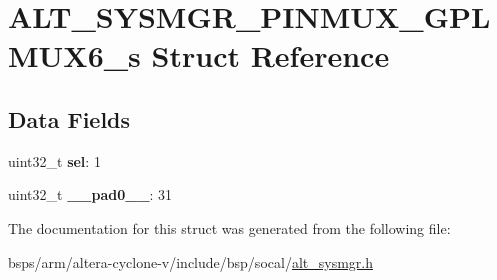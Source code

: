 \hypertarget{structALT__SYSMGR__PINMUX__GPLMUX6__s}{}\section{A\+L\+T\+\_\+\+S\+Y\+S\+M\+G\+R\+\_\+\+P\+I\+N\+M\+U\+X\+\_\+\+G\+P\+L\+M\+U\+X6\+\_\+s Struct Reference}
\label{structALT__SYSMGR__PINMUX__GPLMUX6__s}
\subsection*{Data Fields}
\begin{DoxyCompactItemize}
\item 
\mbox{\label{structALT__SYSMGR__PINMUX__GPLMUX6__s_a78daf56e6d9686dd5d7e8505b6505395}} 
uint32\+\_\+t {\bfseries sel}\+: 1
\item 
\mbox{\label{structALT__SYSMGR__PINMUX__GPLMUX6__s_aea834a2154b2e953734ac8dec5699b3a}} 
uint32\+\_\+t {\bfseries \+\_\+\+\_\+pad0\+\_\+\+\_\+}\+: 31
\end{DoxyCompactItemize}


The documentation for this struct was generated from the following file\+:\begin{DoxyCompactItemize}
\item 
bsps/arm/altera-\/cyclone-\/v/include/bsp/socal/\mbox{\hyperlink{alt__sysmgr_8h}{alt\+\_\+sysmgr.\+h}}\end{DoxyCompactItemize}
